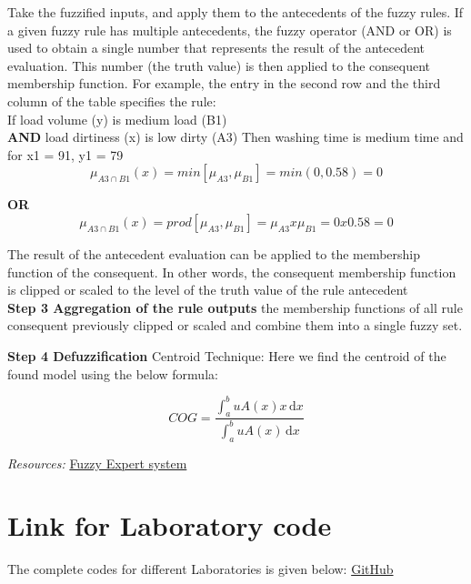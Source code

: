 \documentclass[15pt,journal]{IEEEtran}
\begin{document}
Take the fuzzified inputs, and apply them to the antecedents of the fuzzy rules. If a given fuzzy rule has multiple antecedents, the fuzzy operator (AND or OR) is used to obtain a single number that represents the result of the antecedent evaluation. This number (the truth value) is then applied to the consequent membership function.
For example, the entry in the second row and the third column of the table specifies the rule:\\
If load volume (y) is medium load (B1)\\
\textbf{AND} load dirtiness (x) is low dirty (A3)
Then washing time is medium time
and for x1 = 91, y1 = 79\\
\begin{equation}
    \mu_{A3\cap B1} (x) = min[\mu_{A3},\mu_{B1}]   = min(0,0.58)=0 
\end{equation}

\textbf{OR}
\begin{equation}
    \mu_{A3\cap B1} (x) = prod[\mu_{A3},\mu_{B1}]   = \mu_{A3} x \mu_{B1} = 0x0.58 =0 
\end{equation}

The result of the antecedent evaluation can be applied to the membership function of the consequent. In other words, the consequent membership function is clipped or scaled to the level of the truth value of the rule antecedent\\

\textbf{Step 3 Aggregation of the rule outputs} the membership functions of all rule consequent previously clipped or scaled and combine them into a single fuzzy set.

\textbf{Step 4 Defuzzification} Centroid Technique: Here we find the centroid of the found  model using the below formula:



\begin{equation}
COG = \frac{\int_a^b\!uA(x)x\, \mathrm{d}x}{\int_a^b\!uA(x)\, \mathrm{d}x}
\label{eq:cogCont}
\end{equation}


\emph{Resources:} \href{http://www.cs.utsa.edu/~bylander/cs5233/a-b-analysis.pdf}{Fuzzy Expert system}




\section{{Link for Laboratory code}}
The complete codes for different Laboratories is given below:
\href{https://github.com/rakshil14-2/AI-LabCodes}{GitHub}
\end{document}
